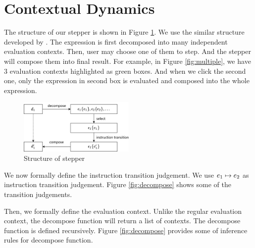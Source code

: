 \section{Contextual Dynamics}
\label{sec:condy}



The structure of our stepper is shown in Figure \ref{fig:structure}. We use the similar structure developed by \citet{cong_implementing_nodate}. The expression is first decomposed into many independent evaluation contexts. Then, user may choose one of them to step. And the stepper will compose them into final result. For example, in Figure \ref{fig:multiple}, we have 3 evaluation contexts highlighted as green boxes. And when we click the second one, only the expression in second box is evaluated and composed into the whole expression.

\begin{figure}[htbp]
  \centering
  \includegraphics[width=0.5\textwidth]{img/struct.png}
  \caption{Structure of stepper}
  \label{fig:structure}
\end{figure}

We now formally define the instruction transition judgement. We use $e_1 \mapsto e_2$ as instruction transition judgement. Figure \ref{fig:decompose} shows some of the transition judgements.


Then, we formally define the evaluation context. Unlike the regular evaluation context, the decompose function will return a list of contexts. The decompose function is defined recursively. Figure \ref{fig:decompose} provides some of inference rules for decompose function.

